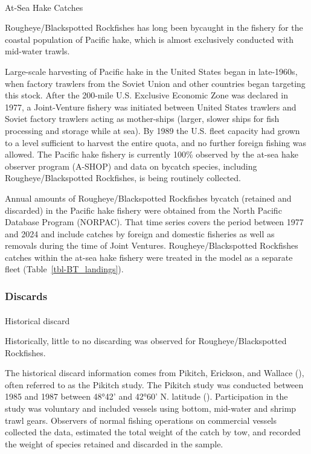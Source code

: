 \documentclass[
]{scrartcl}
\makeatletter
\let\oldparagraph\paragraph
\renewcommand{\paragraph}{
    \@ifstar
      \xxxParagraphStar
      \xxxParagraphNoStar
  }
\newcommand{\xxxParagraphStar}[1]{\oldparagraph*{#1}\mbox{}}
\newcommand{\xxxParagraphNoStar}[1]{\oldparagraph{#1}\mbox{}}
\makeatother
\begin{document}
\paragraph{At-Sea Hake Catches}\label{at-sea-hake-catches}

Rougheye/Blackspotted Rockfishes has long been bycaught in the fishery
for the coastal population of Pacific hake, which is almost exclusively
conducted with mid-water trawls.

Large-scale harvesting of Pacific hake in the United States began in
late-1960s, when factory trawlers from the Soviet Union and other
countries began targeting this stock. After the 200-mile U.S. Exclusive
Economic Zone was declared in 1977, a Joint-Venture fishery was
initiated between United States trawlers and Soviet factory trawlers
acting as mother-ships (larger, slower ships for fish processing and
storage while at sea). By 1989 the U.S. fleet capacity had grown to a
level sufficient to harvest the entire quota, and no further foreign
fishing was allowed. The Pacific hake fishery is currently 100\%
observed by the at-sea hake observer program (A-SHOP) and data on
bycatch species, including Rougheye/Blackspotted Rockfishes, is being
routinely collected.

Annual amounts of Rougheye/Blackspotted Rockfishes bycatch (retained and
discarded) in the Pacific hake fishery were obtained from the North
Pacific Database Program (NORPAC). That time series covers the period
between 1977 and 2024 and include catches by foreign and domestic
fisheries as well as removals during the time of Joint Ventures.
Rougheye/Blackspotted Rockfishes catches within the at-sea hake fishery
were treated in the model as a separate fleet
(Table~\ref{tbl-BT_landings}).

\subsubsection{Discards}\label{discards}

\paragraph{Historical discard}\label{sec-historical_discard}

Historically, little to no discarding was observed for
Rougheye/Blackspotted Rockfishes.

The historical discard information comes from Pikitch, Erickson, and
Wallace (), often referred
to as the Pikitch study. The Pikitch study was conducted between 1985
and 1987 between 48°42' and 42°60' N. latitude
(). Participation in the study was voluntary and included vessels
using bottom, mid-water and shrimp trawl gears. Observers of normal
fishing operations on commercial vessels collected the data, estimated
the total weight of the catch by tow, and recorded the weight of species
retained and discarded in the sample.
\end{document}
